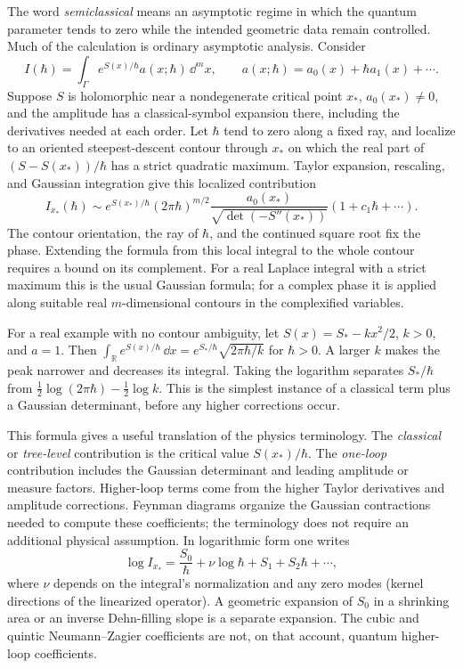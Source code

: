 The word \emph{semiclassical} means an asymptotic regime in which
the quantum parameter tends to zero while the intended geometric
data remain controlled. Much of the calculation is ordinary
asymptotic analysis. Consider
\begin{equation}
 I(\hbar)=\int_\Gamma e^{S(x)/\hbar}
                 a(x;\hbar)\,\dd^m x,
 \qquad a(x;\hbar)=a_0(x)+\hbar a_1(x)+\cdots.
 \label{eq:introsaddleintegral}
\end{equation}
Suppose $S$ is holomorphic near a nondegenerate critical point
$x_*$, $a_0(x_*)\ne0$, and the amplitude has a classical-symbol
expansion there, including the derivatives needed at each order.
Let $\hbar$ tend to zero along a fixed ray, and localize to an
oriented steepest-descent contour through $x_*$ on which the real
part of $(S-S(x_*))/\hbar$ has a strict quadratic maximum.
Taylor expansion, rescaling, and Gaussian integration give this
localized contribution
\begin{equation}
 I_{x_*}(\hbar)\sim
 e^{S(x_*)/\hbar}(2\pi\hbar)^{m/2}
 \frac{a_0(x_*)}{\sqrt{\det(-S''(x_*))}}
 (1+c_1\hbar+\cdots).
 \label{eq:introgaussian}
\end{equation}
The contour orientation, the ray of $\hbar$, and the continued
square root fix the phase. Extending the formula from this local
integral to the whole contour requires a bound on its complement.
For a real
Laplace integral with a strict maximum this is the usual Gaussian
formula; for a complex phase it is applied along suitable real
$m$-dimensional contours in the complexified variables.

For a real example with no contour ambiguity, let
$S(x)=S_*-kx^2/2$, $k>0$, and $a=1$. Then
$\int_{\mathbb R}e^{S(x)/\hbar}\,\dd x
=e^{S_*/\hbar}\sqrt{2\pi\hbar/k}$ for $\hbar>0$.
A larger $k$ makes the peak narrower and decreases its integral.
Taking the logarithm separates $S_*/\hbar$ from
$\tfrac12\log(2\pi\hbar)-\tfrac12\log k$.
This is the simplest instance of a classical term plus a
Gaussian determinant, before any higher corrections occur.

This formula gives a useful translation of the physics terminology.
The \emph{classical} or \emph{tree-level} contribution is the
critical value $S(x_*)/\hbar$. The \emph{one-loop} contribution
includes the Gaussian determinant and leading amplitude or measure
factors. Higher-loop terms come from the higher Taylor derivatives
and amplitude corrections. Feynman diagrams organize the Gaussian
contractions needed to compute these coefficients; the terminology
does not require an additional physical assumption. In logarithmic
form one writes
\[
 \log I_{x_*}=\frac{S_0}{\hbar}
      +\nu\log\hbar+S_1+S_2\hbar+\cdots,
\]
where $\nu$ depends on the integral's normalization and any zero
modes (kernel directions of the linearized operator). A geometric expansion of $S_0$ in a shrinking area or an
inverse Dehn-filling slope is a separate expansion. The cubic and
quintic Neumann--Zagier coefficients are not, on that account,
quantum higher-loop coefficients.


